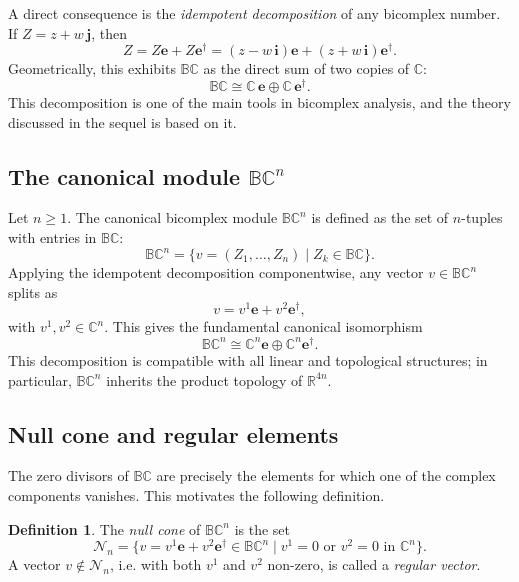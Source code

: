 \documentclass[11pt]{amsart}
\newcommand{\BC}{\mathbb{BC}}       %
\newcommand{\C}{\mathbb{C}}          %
\newcommand{\R}{\mathbb{R}}
\newcommand{\e}{\mathbf{e}}          %
\newcommand{\ed}{\mathbf{e}^\dagger} %
\newcommand{\iunit}{\mathbf{i}}      %
\newcommand{\junit}{\mathbf{j}}      %
\theoremstyle{definition}
\newtheorem{defn}[prop]{Definition}       %
\begin{document}
A direct consequence is the \emph{idempotent decomposition} of any bicomplex number. If $Z = z + w\,\junit$, then
\begin{equation*}
    Z = Z\e + Z\ed = (z - w\,\iunit)\e + (z + w\,\iunit)\ed.
\end{equation*}
Geometrically, this exhibits $\BC$ as the direct sum of two copies of $\C$:
\begin{equation*}
    \BC \cong \C\,\e \oplus \C\,\ed.
\end{equation*}
This decomposition is one of the main tools in bicomplex analysis, and the theory discussed in the sequel is based on it. 

\subsection{The canonical module \texorpdfstring{$\BC^n$}{}}

Let $n \geq 1$. The canonical bicomplex module $\BC^n$ is defined as the set of $n$-tuples with entries in $\BC$:
\begin{equation*}
    \BC^n = \{ v = (Z_1, \dots, Z_n) \mid Z_k \in \BC \}.
\end{equation*}
Applying the idempotent decomposition componentwise, any vector $v \in \BC^n$ splits as
\begin{equation*}
    v = v^1\e + v^2\ed,
\end{equation*}
with $v^1, v^2 \in \C^n$. This gives the fundamental canonical isomorphism
\begin{equation*}
    \BC^n \cong \C^n\e \oplus \C^n\ed.
\end{equation*}
This decomposition is compatible with all linear and topological structures; in particular, $\BC^n$ inherits the product topology of $\R^{4n}$.

\subsection{Null cone and regular elements}\label{subsec:null-cone}

The zero divisors of $\BC$ are precisely the elements for which one of the complex components vanishes. This motivates the following definition.

\begin{defn}
    The \emph{null cone} of $\BC^n$ is the set
    \begin{equation*}
        \mathcal{N}_n = \{ v = v^1\e + v^2\ed \in \BC^n \mid v^1 = 0 \text{ or } v^2 = 0 \text{ in } \C^n \}.
    \end{equation*}
    A vector $v \notin \mathcal{N}_n$, i.e. with both $v^1$ and $v^2$ non-zero, is called a \emph{regular vector}.
\end{defn}
\end{document}
